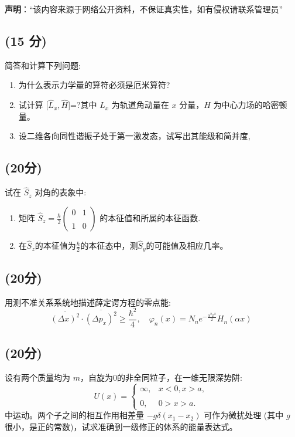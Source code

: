 
\textbf{声明}：“该内容来源于网络公开资料，不保证真实性，如有侵权请联系管理员”

\subsection{(15 分)}
简答和计算下列问题:
\begin{enumerate}
    \item 为什么表示力学量的算符必须是厄米算符?
    \item 试计算 [$\hat{L}_x ,\hat{H}$]=?其中 $\hat{L}_x$ 为轨道角动量在 $x$ 分量，$\hat{H}$ 为中心力场的哈密顿量。
    \item 设二维各向同性谐振子处于第一激发态，试写出其能级和简并度,
\end{enumerate}
\subsection{(20分)}
试在 $\hat{S}_z$ 对角的表象中:
\begin{enumerate}
    \item 矩阵 $\hat{S}_z = \frac{\hbar}{2}\begin{pmatrix} 0 & 1 \\\\ 1 & 0 \end{pmatrix}$ 的本征值和所属的本征函数.
    \item 在$\hat{S}_z$的本征值为$\frac{\hbar}{2}$的本征态中，测$\hat{S}_y$的可能值及相应几率。
\end{enumerate}
\subsection{(20分)}
用测不准关系系统地描述薛定谔方程的零点能:
$$\overline{( \Delta x )^2} \cdot \overline{( \Delta p_x )^2 }\geq \frac{\hbar^2}{4}, \quad
\varphi_n(x) = N_n e^{-\frac{\alpha^2 x^2}{2}} H_n(\alpha x)~$$
\subsection{(20分)}
设有两个质量均为 $m$，自旋为0的非全同粒子，在一维无限深势阱:
\[U(x) = \begin{cases}       \infty, & x<0,x>a, \\\\   0, & 0>x>a.    \end{cases}~\]
中运动。两个子之间的相互作用相差量 $- g \delta(x_1- x_2)$ 可作为微扰处理 (其中 $g$ 很小，是正的常数)，试求准确到一级修正的体系的能量表达式。

